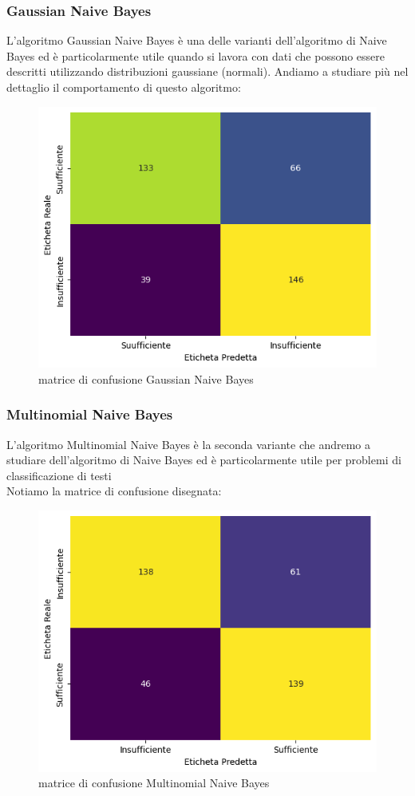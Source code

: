 \documentclass{article}
\begin{document}
\begin{titlepage}
        \subsubsection{Gaussian Naive Bayes}
         L'algoritmo Gaussian Naive Bayes è una delle varianti dell'algoritmo di Naive Bayes ed è particolarmente utile quando si lavora con dati che possono essere descritti utilizzando distribuzioni gaussiane (normali). Andiamo a studiare più nel dettaglio il comportamento di questo algoritmo:

         \begin{figure}[ht]
            \centering
            \includegraphics[width=0.6\linewidth]{confusion_matrix-GNB.png}
            \caption{  matrice di confusione Gaussian Naive Bayes}
            \label{fig:enter-label}
        \end{figure}
        \newpage
        \subsubsection{Multinomial Naive Bayes}
        L'algoritmo Multinomial Naive Bayes è la seconda variante che andremo a studiare dell'algoritmo di Naive Bayes ed è particolarmente utile per problemi di classificazione di testi\\ Notiamo la matrice di confusione disegnata:
        \begin{figure}[ht]
            \centering
            \includegraphics[width=0.6\linewidth]{confusion_matrix-MNB.png}
            \caption{  matrice di confusione Multinomial Naive Bayes}
            \label{fig:enter-label}
        \end{figure}
        

\end{titlepage}
\end{document}
